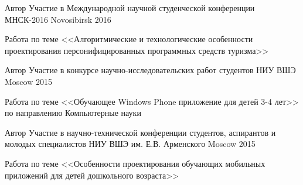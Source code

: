 \begin{cventries}

\cventry
{Автор} %
{Участие в Международной научной студенческой конференции МНСК-2016} %
{Novosibirsk} %
{2016} %
{ %
\begin{cvitems}
\item {Работа по теме <<Алгоритмические и технологические особенности проектирования персонифицированных программных средств туризма>>}
\end{cvitems}
}


\cventry
{Автор} %
{Участие в конкурсе научно-исследовательских работ студентов НИУ ВШЭ} %
{Moscow} %
{2015} %
{ %
\begin{cvitems}
\item {Работа по теме <<Обучающее Windows Phone приложение для детей 3-4 лет>> по направлению Компьютерные науки}
\end{cvitems}
}

\cventry
{Автор} %
{Участие в научно-технической конференции студентов, аспирантов и молодых специалистов НИУ ВШЭ им. Е.В. Арменского} %
{Moscow} %
{2015} %
{ %
\begin{cvitems}
\item {Работа по теме <<Особенности проектирования обучающих мобильных приложений для детей дошкольного возраста>>}
\end{cvitems}
}

\end{cventries}